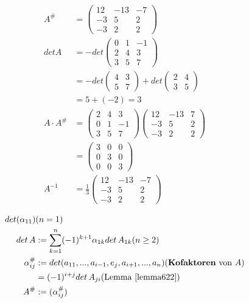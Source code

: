 \documentclass[11pt]{report}
\newcommand*\f[1] {\textbf{#1}}
\begin{document}
\begin{align}
A^{\#} &= \begin{pmatrix} 12 & -13 & -7 \\ -3 & 5 & 2 \\ -3 & 2 & 2 \end{pmatrix} \\
det A &= -det \begin{pmatrix} 0 & 1 & -1 \\ 2 & 4 & 3 \\ 3 & 5 & 7 \end{pmatrix} \\
&= - det \begin{pmatrix} 4 & 3 \\ 5 & 7 \end{pmatrix}+ det \begin{pmatrix} 2 & 4 \\ 3 & 5 \end{pmatrix} \\
&= 5 + (-2) = 3 \\
A \cdot A^{\#} &= \begin{pmatrix} 2 & 4 & 3 \\ 0 & 1 & -1 \\ 3 & 5 & 7\end{pmatrix} \begin{pmatrix} 12 & -13 & 7 \\ -3 & 5 & 2 \\ -3 & 2 & 2 \end{pmatrix} \\
&= \begin{pmatrix} 3 & 0 & 0 \\ 0 & 3 & 0 \\ 0 & 0 & 3\end{pmatrix} \\
A^{-1} &= \frac{1}{3} \begin{pmatrix} 12 & -13 & -7 \\ -3 & 5 & 2 \\ -3 & 2 & 2\end{pmatrix}
\end{align}


\begin{align}
det(\alpha_{11})& (n=1) \\
det\, A &:= \sum_{k=1}^{n} (-1)^{k+1} \alpha_{1k} det \, A_{1k} (n \geq 2) \\
\alpha_{ij}^{\#} &:= det(a_{11}, ..., a_{i-1}, e_j, a_{i+1}, ..., a_n) (\text{\f{Kofaktoren} von $A$}) \\
&= (-1)^{i+j} det\, A_{ji} (\text{Lemma \ref{lemma622}}) \\
A^{\#} &:= (\alpha_{ij}^{\#})
\end{align}
\end{document}
